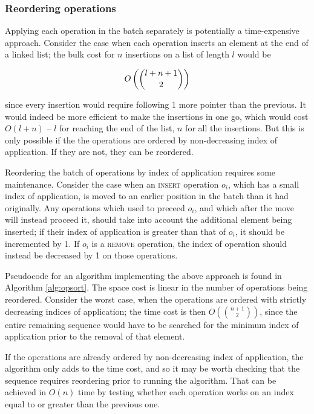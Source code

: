 \subsubsection{Reordering operations}

Applying each operation in the batch separately is potentially a time-expensive
approach. Consider the case when each operation inserts an element at the end of
a linked list; the bulk cost for $n$ insertions on a list of length $l$ would be

$$O\left(\dbinom{l+n+1}{2}\right)$$

since every insertion would require following 1 more pointer than the previous.
It would indeed be more efficient to make the insertions in one go, which would
cost $O(l+n)$ -- $l$ for reaching the end of the list, $n$ for all the
insertions. But this is only possible if the the operations are ordered by
non-decreasing index of application. If they are not, they can be reordered.

Reordering the batch of operations by index of application requires some
maintenance. Consider the case when an \textsc{insert} operation $o_i$, which
has a small index of application, is moved to an earlier position in the batch
than it had originally. Any operations which used to preceed $o_i$, and which
after the move will instead proceed it, should take into account the additional
element being inserted; if their index of application is greater than that of
$o_i$, it should be incremented by 1. If $o_i$ is a \textsc{remove} operation,
the index of operation should instead be decreased by 1 on those operations.

Pseudocode for an algorithm implementing the above approach is found in
Algorithm \ref{alg:opsort}. The space cost is linear in the number of operations
being reordered. Consider the worst case, when the operations are ordered with
strictly decreasing indices of application; the time cost is then
$O\left(\binom{n+1}{2}\right)$, since the entire remaining sequence would have
to be searched for the minimum index of application prior to the removal of that
element.

If the operations are already ordered by non-decreasing index of application,
the algorithm only adds to the time cost, and so it may be worth checking that
the sequence requires reordering prior to running the algorithm. That can be
achieved in $O(n)$ time by testing whether each operation works on an index
equal to or greater than the previous one.


